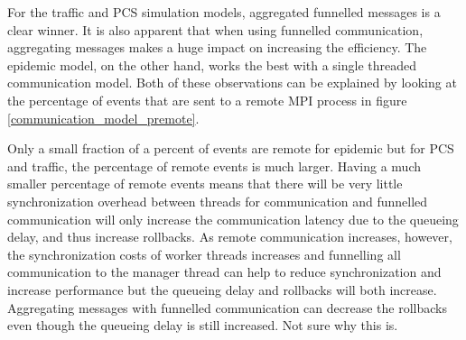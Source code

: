 \documentclass[11pt]{book}
\begin{document}
For the traffic and PCS simulation models, aggregated funnelled messages is a clear winner.  It
is also apparent that when using funnelled communication, aggregating messages makes a huge
impact on increasing the efficiency.  The epidemic model, on the other hand, works the best with
a single threaded communication model.  Both of these observations can be explained by looking
at the percentage of events that are sent to a remote MPI process in figure \ref{communication_model_premote}.

Only a small fraction of a percent of events are remote for epidemic but for PCS and traffic,
the percentage of remote events is much larger.  Having a much smaller percentage of remote
events means that there will be very little synchronization overhead between threads for communication
and funnelled communication will only increase the communication latency due to the queueing delay,
and thus increase rollbacks.  As remote communication increases, however, the synchronization costs
of worker threads increases and funnelling all communication to the manager thread can help to
reduce synchronization and increase performance but the queueing delay and rollbacks will both
increase.  Aggregating messages with funnelled communication can decrease the rollbacks even
though the queueing delay is still increased.  Not sure why this is.
\end{document}

